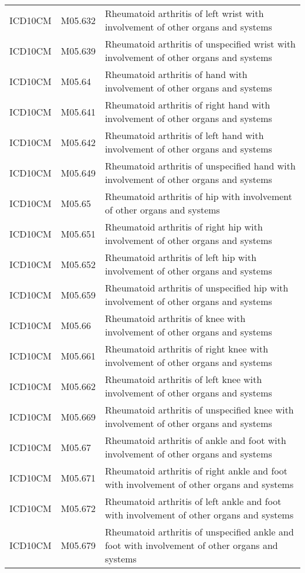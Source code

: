 \begin{table}[ht]
\begin{tabular}{lll}
  ICD10CM & M05.632 & Rheumatoid arthritis of left wrist with involvement of other organs and systems \\ 
  ICD10CM & M05.639 & Rheumatoid arthritis of unspecified wrist with involvement of other organs and systems \\ 
  ICD10CM & M05.64 & Rheumatoid arthritis of hand with involvement of other organs and systems \\ 
  ICD10CM & M05.641 & Rheumatoid arthritis of right hand with involvement of other organs and systems \\ 
  ICD10CM & M05.642 & Rheumatoid arthritis of left hand with involvement of other organs and systems \\ 
  ICD10CM & M05.649 & Rheumatoid arthritis of unspecified hand with involvement of other organs and systems \\ 
  ICD10CM & M05.65 & Rheumatoid arthritis of hip with involvement of other organs and systems \\ 
  ICD10CM & M05.651 & Rheumatoid arthritis of right hip with involvement of other organs and systems \\ 
  ICD10CM & M05.652 & Rheumatoid arthritis of left hip with involvement of other organs and systems \\ 
  ICD10CM & M05.659 & Rheumatoid arthritis of unspecified hip with involvement of other organs and systems \\ 
  ICD10CM & M05.66 & Rheumatoid arthritis of knee with involvement of other organs and systems \\ 
  ICD10CM & M05.661 & Rheumatoid arthritis of right knee with involvement of other organs and systems \\ 
  ICD10CM & M05.662 & Rheumatoid arthritis of left knee with involvement of other organs and systems \\ 
  ICD10CM & M05.669 & Rheumatoid arthritis of unspecified knee with involvement of other organs and systems \\ 
  ICD10CM & M05.67 & Rheumatoid arthritis of ankle and foot with involvement of other organs and systems \\ 
  ICD10CM & M05.671 & Rheumatoid arthritis of right ankle and foot with involvement of other organs and systems \\ 
  ICD10CM & M05.672 & Rheumatoid arthritis of left ankle and foot with involvement of other organs and systems \\ 
  ICD10CM & M05.679 & Rheumatoid arthritis of unspecified ankle and foot with involvement of other organs and systems \\ 

\end{tabular}
\end{table}
